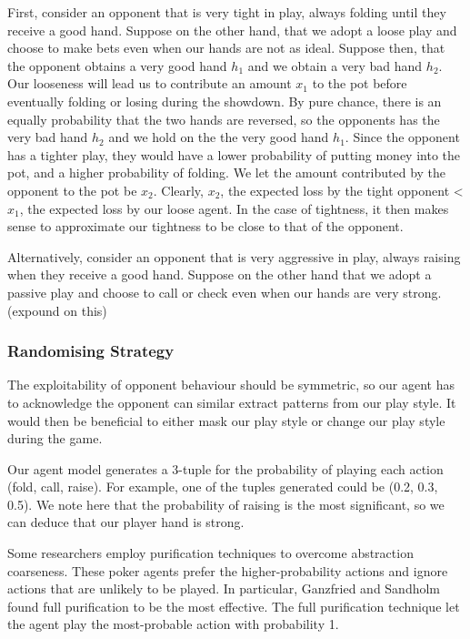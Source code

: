 \documentclass{article}
\begin{document}
First, consider an opponent that is very tight in play, always folding until they receive a good hand. Suppose on the other hand, that we adopt a loose play and choose to make bets even when our hands are not as ideal. Suppose then, that the opponent obtains a very good hand $h_1$ and we obtain a very bad hand $h_2$. Our looseness will lead us to contribute an amount $x_1$ to the pot before eventually folding or losing during the showdown. By pure chance, there is an equally probability that the two hands are reversed, so the opponents has the very bad hand $h_2$ and we hold on the the very good hand $h_1$. Since the opponent has a tighter play, they would have a lower probability of putting money into the pot, and a higher probability of folding. We let the amount contributed by the opponent to the pot be $x_2$. Clearly, $x_2$, the expected loss by the tight opponent < $x_1$, the expected loss by our loose agent. In the case of tightness, it then makes sense to approximate our tightness to be close to that of the opponent.

Alternatively, consider an opponent that is very aggressive in play, always raising when they receive a good hand. Suppose on the other hand that we adopt a passive play and choose to call or check even when our hands are very strong. (expound on this)

\subsubsection{Randomising Strategy}

The exploitability of opponent behaviour should be symmetric, so our agent has to acknowledge the opponent can similar extract patterns from our play style. It would then be beneficial to either mask our play style or change our play style during the game.

Our agent model generates a 3-tuple for the probability of playing each action (fold, call, raise). For example, one of the tuples generated could be (0.2, 0.3, 0.5). We note here that the probability of raising is the most significant, so we can deduce that our player hand is strong.

Some researchers employ purification techniques to overcome abstraction coarseness. These poker agents prefer the higher-probability actions and ignore actions that are unlikely to be played. In particular, Ganzfried and Sandholm found full purification to be the most effective. The full purification technique let the agent play the most-probable action with probability 1.
\end{document}
